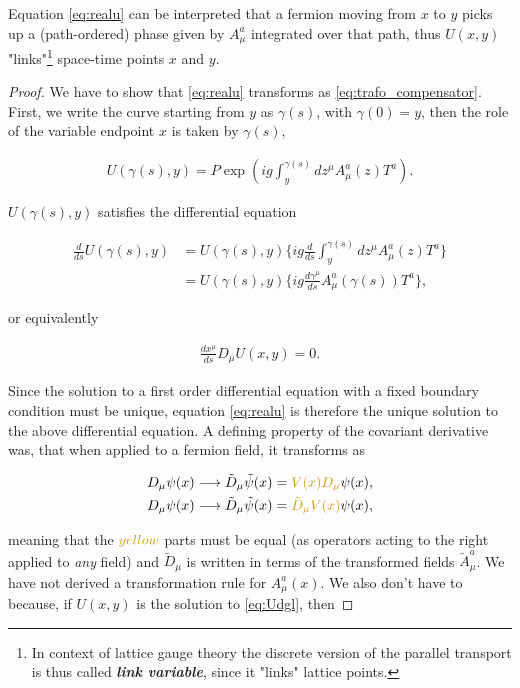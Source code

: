 \documentclass{article}
\theoremstyle{plain} %
\theoremstyle{convention} %
\theoremstyle{remark} %
\def\df#1{\textbf{\textit{#1}}}
\numberwithin{equation}{section}
\begin{document}
Equation \eqref{eq:realu} can be interpreted that a fermion moving from $x$ to $y$ picks up a (path-ordered) phase given by $A_{\mu}^a$ integrated over that path, thus $U(x,y)$ "links"\footnote{In context of lattice gauge theory the discrete version of the parallel transport is thus called \df{link variable}, since it "links" lattice points.} space-time points $x$ and $y$.

\begin{proof}

We have to show that \eqref{eq:realu} transforms as \eqref{eq:trafo_compensator}. First, we write the curve starting from $y$ as $\gamma(s)$, with $\gamma(0)=y$, then the role of the variable endpoint $x$ is taken by $\gamma(s)$,

\begin{align*}
    U(\gamma(s) ,y) = P \exp( ig \int_{y}^{\gamma(s)} d z^{\mu} A_{\mu}^a(z) T^a ).
\end{align*}

$U(\gamma(s) ,y)$ satisfies the differential equation

\begin{align*}
    \frac{d}{ds} U(\gamma(s) ,y) &= U(\gamma(s) ,y) \bigg\{ ig \frac{d}{ds} \int_{y}^{\gamma(s)} d z^{\mu} A_{\mu}^a(z) T^a \bigg\} \\
    &= U(\gamma(s) ,y) \bigg\{ ig \frac{d \gamma^{\mu}}{ds} A_{\mu}^a(\gamma(s)) T^a \bigg\},
\end{align*}

or equivalently

\begin{align}
    \frac{dx^{\mu}}{ds} D_{\mu} U(x,y) = 0. \label{eq:Udgl}
\end{align}

Since the solution to a first order differential equation with a fixed boundary condition must be unique, equation \eqref{eq:realu} is therefore the unique solution to the above differential equation. A defining property of the covariant derivative was, that when applied to a fermion field, it transforms as

\begin{align*}
    D_{\mu} \psi(x) &\longrightarrow \tilde{D}_{\mu} \tilde{\psi}(x) = \textcolor{cyellow}{V(x) D_{\mu}} \psi(x), \\
    D_{\mu} \psi(x) &\longrightarrow \tilde{D}_{\mu} \tilde{\psi}(x) = \textcolor{cyellow}{\tilde{D}_{\mu} V(x)} \psi(x),
\end{align*}

meaning that the $\textcolor{cyellow}{yellow}$ parts must be equal (as operators acting to the right applied to \textit{any} field) and $\tilde{D}_{\mu}$ is written in terms of the transformed fields $\tilde{A}_{\mu}^a$. We have not derived a transformation rule for $A_{\mu}^a(x)$. We also don't have to because, if $U(x,y)$ is the solution to \eqref{eq:Udgl}, then


\end{proof}
\end{document}
